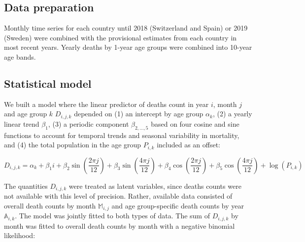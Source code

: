 \documentclass{article}
\begin{document}
	\subsection{Data preparation}
	
	Monthly time series for each country until 2018 (Switzerland and Spain) or 2019 (Sweden) were combined with the provisional estimates from each country in most recent years. Yearly deaths by 1-year age groups were combined into 10-year age bands. 
	
	\subsection{Statistical model}
	
	We built a model where the linear predictor of deaths count in year $i$, month $j$ and age group $k$ $D_{i,j,k}$ depended on (1) an intercept by age group $\alpha_k$, (2) a yearly linear trend $\beta_1$, (3) a periodic component $\beta_{2,\ldots,5}$ based on four cosine and sine functions to account for temporal trends and seasonal variability in mortality, and (4) the total population in the age group $P_{i,k}$ included as an offset: 
	
	\begin{equation}
		D_{i,j,k} = \alpha_k + 
		\beta_1 i + 
		\beta_2 \sin\left(\frac{2\pi j}{12}\right) + 
		\beta_3 \sin\left(\frac{4\pi j}{12}\right) + 
		\beta_4 \cos\left(\frac{2\pi j}{12}\right) + 
		\beta_5 \cos\left(\frac{4\pi j}{12}\right) + 
		\log(P_{i,k})
	\end{equation}
	
	
	The quantities $D_{i,j,k}$ were treated as latent variables, since deaths counts were not available with this level of precision. Rather, available data consisted of overall death counts by month $\mathds{M}_{i,j}$ and age group-specific death counts by year $\mathds{A}_{i,k}$. The model was jointly fitted to both types of data.  The sum of $D_{i,j,k}$ by month was fitted to overall death counts by month with a negative binomial likelihood:
	
\end{document}
